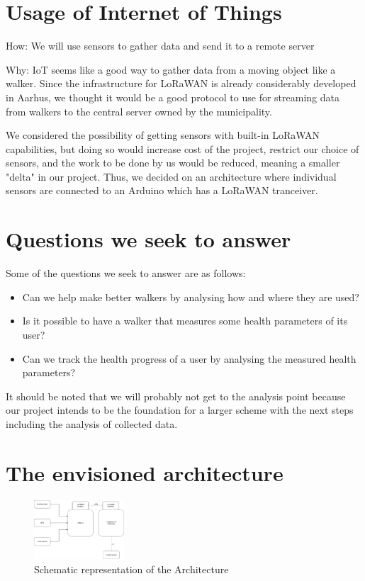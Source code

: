 \documentclass[conference]{IEEEtran}
\begin{document}
\section{Usage of Internet of Things}

How: We will use sensors to gather data and send it to a remote server
	
Why: IoT seems like a good way to gather data from a moving object like a walker. Since the infrastructure for LoRaWAN is already considerably developed in Aarhus, we thought it would be a good protocol to use for streaming data from walkers to the central server owned by the municipality.

We considered the possibility of getting sensors with built-in LoRaWAN capabilities, but doing so would increase cost of the project, restrict our choice of sensors, and the work to be done by us would be reduced, meaning a smaller "delta" in our project. Thus, we decided on an architecture where individual sensors are connected to an Arduino which has a LoRaWAN tranceiver.


\section{Questions we seek to answer}
Some of the questions we seek to answer are as follows:

\begin{itemize}
	\item Can we help make better walkers by analysing how and where they are used?
	
	\item Is it possible to have a walker that measures some health parameters of its user? 
	
	\item Can we track the health progress of a user by analysing the measured health parameters?
\end{itemize}

It should be noted that we will probably not get to the analysis point because our project intends to be the foundation for a larger scheme with the next steps including the analysis of collected data.

\section{The envisioned architecture}

\begin{figure}[H]
	\begin{center}
		\includegraphics[width=0.3\textwidth]{images/Architecture.png}
		\caption[]{Schematic representation of the Architecture}
	\end{center}	
\end{figure}
\end{document}
